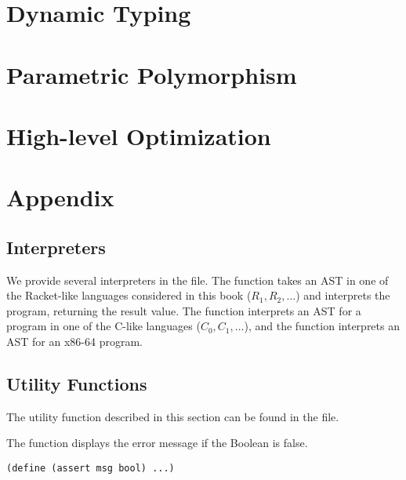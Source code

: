 \documentclass[11pt]{book}
\begin{document}
\chapter{Dynamic Typing}
\label{ch:type-dynamic}


\chapter{Parametric Polymorphism}
\label{ch:parametric-polymorphism}

\chapter{High-level Optimization}
\label{ch:high-level-optimization}

\chapter{Appendix}

\section{Interpreters}
\label{appendix:interp}

We provide several interpreters in the  file.  The
 function takes an AST in one of the Racket-like
languages considered in this book ($R_1, R_2, \ldots$) and interprets
the program, returning the result value.  The  function
interprets an AST for a program in one of the C-like languages ($C_0,
C_1, \ldots$), and the  function interprets an AST
for an x86-64 program.

\section{Utility Functions}
\label{appendix:utilities}

The utility function described in this section can be found in the
 file.

The  function displays the error message  if the
Boolean  is false.
\begin{lstlisting}
(define (assert msg bool) ...)
\end{lstlisting}
\end{document}
